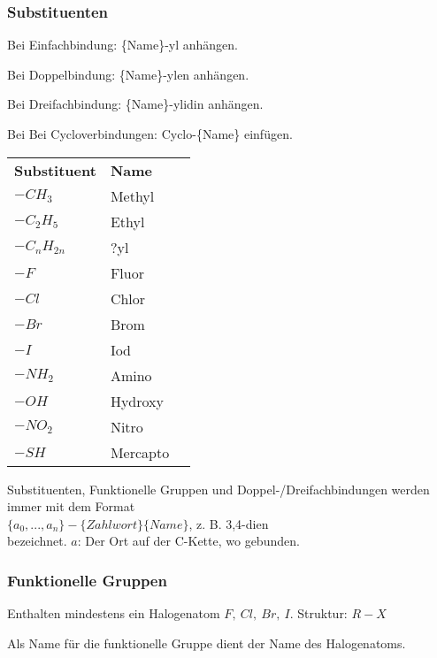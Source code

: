 \subsubsection{Substituenten}

Bei Einfachbindung: \{Name\}-yl anhängen.

Bei Doppelbindung:  \{Name\}-ylen anhängen.

Bei Dreifachbindung:  \{Name\}-ylidin anhängen.

Bei Bei Cycloverbindungen:  Cyclo-\{Name\} einfügen.

\begin{center}
	\begin{tabular}{ l  l  l }
		\textbf{Substituent} & \textbf{Name} \\
		$-CH_3$ & Methyl \\
		$-C_2H_5$ & Ethyl \\
		$-C_nH_{2n}$ & ?yl \\
		$-F$ & Fluor \\
		$-Cl$ & Chlor \\
		$-Br$ & Brom \\
		$-I$ & Iod \\
		$-NH_2$ & Amino \\
		$-OH$ & Hydroxy \\
		$-NO_2$ & Nitro \\
		$-SH$ & Mercapto \\
	\end{tabular}
\end{center}

\begin{note}
	Substituenten, Funktionelle Gruppen und Doppel-/Dreifachbindungen werden immer mit dem Format \\
	
	$\{a_0,...,a_n\}-\{Zahlwort\}\{Name\}$, z. B. 3,4-dien \\
	
	bezeichnet. 
	$a$: Der Ort auf der C-Kette, wo gebunden.
\end{note}

\subsubsection{Funktionelle Gruppen}

\begin{definition}
	Enthalten mindestens ein Halogenatom $F,\ Cl,\ Br,\ I$. Struktur: $R-X$
	
	Als Name für die funktionelle Gruppe dient der Name des Halogenatoms. 
\end{definition}

